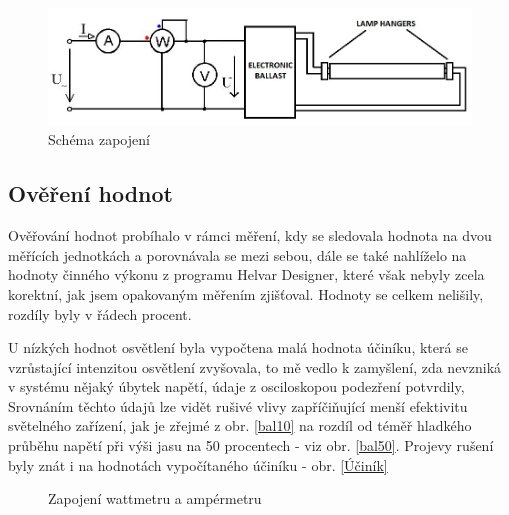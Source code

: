 \documentclass[FM,RP]{tulthesis}
\begin{document}
   \begin{figure}[h]
   	\begin{center}
   		\includegraphics[scale=0.60]{Scheme.jpg}
   		\caption{Schéma zapojení}
   		\label{Scheme}
   	\end{center}
   \end{figure}
    
   
    
  \subsection {Ověření hodnot}
        Ověřování hodnot probíhalo v rámci měření, kdy se sledovala hodnota na dvou měřících jednotkách a porovnávala se mezi sebou, dále se také nahlíželo na hodnoty činného výkonu z programu Helvar Designer, které však nebyly zcela korektní, jak jsem opakovaným měřením zjišťoval. Hodnoty se celkem nelišily, rozdíly byly v řádech procent. 
        
         
        U nízkých hodnot osvětlení byla vypočtena malá hodnota účiníku, která se vzrůstající intenzitou osvětlení zvyšovala, to mě vedlo k zamyšlení, zda nevzniká v systému nějaký úbytek napětí, údaje z osciloskopou podezření potvrdily, Srovnáním těchto údajů lze vidět rušivé vlivy zapříčiňující menší efektivitu světelného zařízení, jak je zřejmé z obr. \ref{bal10} na rozdíl od téměř hladkého průběhu napětí při výši jasu na 50 procentech - viz obr. \ref{bal50}. Projevy rušení byly znát i na hodnotách vypočítaného účiníku - obr. \ref{Účiník} 
 
    \begin{figure}[htp]
    	\begin{center}
    	
    	
    	\caption{Zapojení wattmetru a ampérmetru}
    	\label{watamp}
   \end{center}	
    \end{figure}
     
\end{document}
